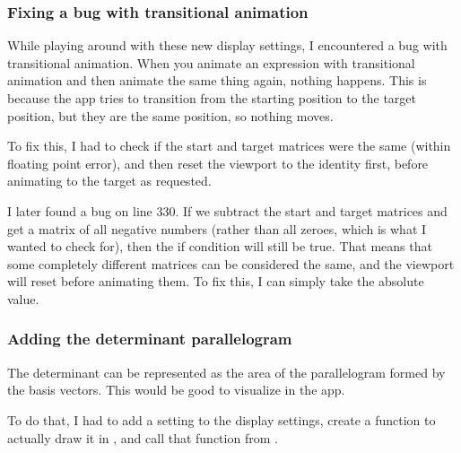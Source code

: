 \documentclass[../development.tex]{subfiles}
\begin{document}
\subsubsection{Fixing a bug with transitional animation\label{development:adding-display-settings:fixing-a-bug-with-transitional-animation}}

While playing around with these new display settings, I encountered a bug with transitional animation. When you animate an expression with transitional animation and then animate the same thing again, nothing happens. This is because the app tries to transition from the starting position to the target position, but they are the same position, so nothing moves.

To fix this, I had to check if the start and target matrices were the same (within floating point error), and then reset the viewport to the identity first, before animating to the target as requested.


I later found a bug on line 330. If we subtract the start and target matrices and get a matrix of all negative numbers (rather than all zeroes, which is what I wanted to check for), then the if condition will still be true. That means that some completely different matrices can be considered the same, and the viewport will reset before animating them. To fix this, I can simply take the absolute value.


\subsubsection{Adding the determinant parallelogram\label{development:adding-display-settings:adding-the-determinant-parallelogram}}

The determinant can be represented as the area of the parallelogram formed by the basis vectors. This would be good to visualize in the app.

To do that, I had to add a setting to the display settings, create a function to actually draw it in , and call that function from .


\end{document}

